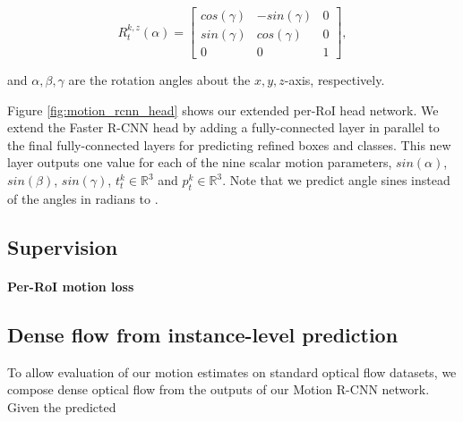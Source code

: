 \begin{equation}
R_t^{k,z}(\alpha) =
\begin{bmatrix}
  cos(\gamma) & -sin(\gamma) & 0 \\
  sin(\gamma) & cos(\gamma) & 0 \\
  0 & 0 & 1
\end{bmatrix},
\end{equation}

and $\alpha, \beta, \gamma$ are the rotation angles about the $x,y,z$-axis, respectively.


Figure \ref{fig:motion_rcnn_head} shows our extended per-RoI head network.
We extend the Faster R-CNN head by adding a fully-connected layer in parallel to the final fully-connected layers for
predicting refined boxes and classes.
This new layer outputs one value for each of the nine scalar motion parameters,
$sin(\alpha)$, $sin(\beta)$, $sin(\gamma)$, $t_t^k \in \mathbb{R}^3$ and $p_t^k \in \mathbb{R}^3$.
Note that we predict angle sines instead of the angles in radians to %
.

\subsection{Supervision}

\paragraph{Per-RoI motion loss}
\subsection{Dense flow from instance-level prediction}
To allow evaluation of our motion estimates on standard optical flow datasets,
we compose dense optical flow from the outputs of our Motion R-CNN network.
Given the predicted
